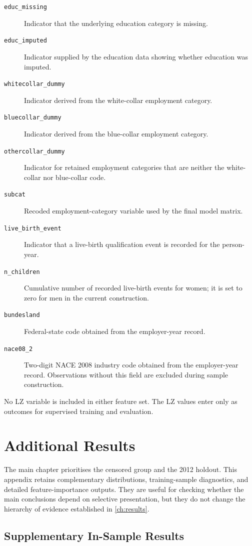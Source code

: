 \documentclass[12pt,a4paper,oneside,titlepage]{book}
\begin{document}
\begin{description}
  \item[\texttt{educ\_missing}] Indicator that the underlying education category is missing.
  \item[\texttt{educ\_imputed}] Indicator supplied by the education data showing whether education was imputed.
  \item[\texttt{whitecollar\_dummy}] Indicator derived from the white-collar employment category.
  \item[\texttt{bluecollar\_dummy}] Indicator derived from the blue-collar employment category.
  \item[\texttt{othercollar\_dummy}] Indicator for retained employment categories that are neither the white-collar nor blue-collar code.
  \item[\texttt{subcat}] Recoded employment-category variable used by the final model matrix.
  \item[\texttt{live\_birth\_event}] Indicator that a live-birth qualification event is recorded for the person-year.
  \item[\texttt{n\_children}] Cumulative number of recorded live-birth events for women; it is set to zero for men in the current construction.
  \item[\texttt{bundesland}] Federal-state code obtained from the employer-year record.
  \item[\texttt{nace08\_2}] Two-digit NACE 2008 industry code obtained from the employer-year record. Observations without this field are excluded during sample construction.
\end{description}

No LZ variable is included in either feature set. The LZ values enter only as outcomes for supervised training and evaluation.

\chapter{Additional Results}
\label{app:additional-results}

The main chapter prioritises the censored group and the 2012 holdout. This appendix retains complementary distributions, training-sample diagnostics, and detailed feature-importance outputs. They are useful for checking whether the main conclusions depend on selective presentation, but they do not change the hierarchy of evidence established in \cref{ch:results}.

\section{Supplementary In-Sample Results}
\end{document}

